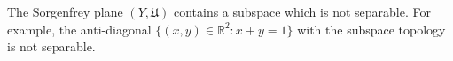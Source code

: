 The Sorgenfrey plane $(Y, \mathfrak{U})$ contains a subspace which is not separable. For example, the anti-diagonal $\{(x, y) \in \mathbb{R}^2 : x + y = 1\}$ with the subspace topology is not separable.
